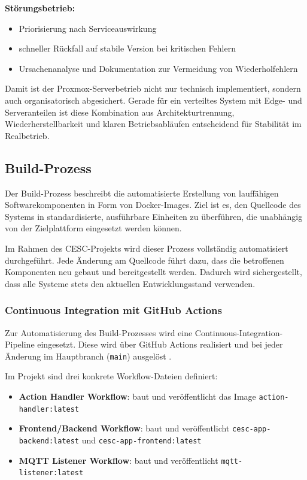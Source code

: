 \textbf{Störungsbetrieb:}
\begin{itemize}
    \item Priorisierung nach Serviceauswirkung
    \item schneller Rückfall auf stabile Version bei kritischen Fehlern
    \item Ursachenanalyse und Dokumentation zur Vermeidung von Wiederholfehlern
\end{itemize}

Damit ist der Proxmox-Serverbetrieb nicht nur technisch implementiert, sondern auch organisatorisch abgesichert. Gerade für ein verteiltes System mit Edge- und Serveranteilen ist diese Kombination aus Architekturtrennung, Wiederherstellbarkeit und klaren Betriebsabläufen entscheidend für Stabilität im Realbetrieb.

\subsection{Build-Prozess}

Der Build-Prozess beschreibt die automatisierte Erstellung von lauffähigen Softwarekomponenten in Form von Docker-Images. Ziel ist es, den Quellcode des Systems in standardisierte, ausführbare Einheiten zu überführen, die unabhängig von der Zielplattform eingesetzt werden können.

Im Rahmen des CESC-Projekts wird dieser Prozess vollständig automatisiert durchgeführt. Jede Änderung am Quellcode führt dazu, dass die betroffenen Komponenten neu gebaut und bereitgestellt werden. Dadurch wird sichergestellt, dass alle Systeme stets den aktuellen Entwicklungsstand verwenden.

\subsubsection{Continuous Integration mit GitHub Actions}

Zur Automatisierung des Build-Prozesses wird eine Continuous-Integration-Pipeline eingesetzt. Diese wird über GitHub Actions realisiert und bei jeder Änderung im Hauptbranch (\texttt{main}) ausgelöst \cite{github_actions_overview}.

Im Projekt sind drei konkrete Workflow-Dateien definiert:

\begin{itemize}
        \item \textbf{Action Handler Workflow}: baut und veröffentlicht das Image \texttt{action-handler:latest}
        \item \textbf{Frontend/Backend Workflow}: baut und veröffentlicht \texttt{cesc-app-backend:latest} und \texttt{cesc-app-frontend:latest}
        \item \textbf{MQTT Listener Workflow}: baut und veröffentlicht \texttt{mqtt-listener:latest}
\end{itemize}

